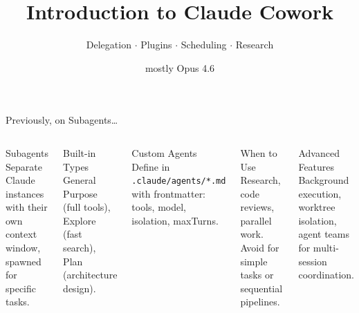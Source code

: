 \documentclass[aspectratio=169]{beamer}
\title{Introduction to Claude Cowork}
\subtitle{Delegation $\cdot$ Plugins $\cdot$ Scheduling $\cdot$ Research}
\author{mostly Opus 4.6}
\date{}
\begin{document}
\begin{frame}
\titlepage
\end{frame}

\begin{frame}{Previously, on Subagents\ldots}
\begin{columns}[T]
\begin{block}{Subagents}
Separate Claude instances with their own context window, spawned for specific tasks.
\end{block}

\begin{block}{Built-in Types}
General Purpose (full tools), Explore (fast search), Plan (architecture design).
\end{block}

\begin{block}{Custom Agents}
Define in \texttt{.claude/agents/*.md} with frontmatter: tools, model, isolation, maxTurns.
\end{block}

\begin{block}{When to Use}
Research, code reviews, parallel work. Avoid for simple tasks or sequential pipelines.
\end{block}

\begin{block}{Advanced Features}
Background execution, worktree isolation, agent teams for multi-session coordination.
\end{block}
\end{columns}
\end{frame}
\end{document}
